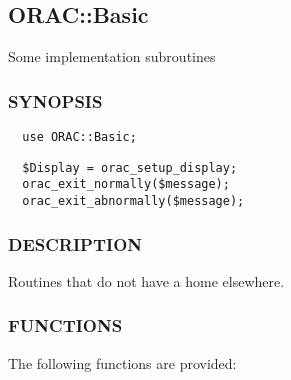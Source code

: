 \subsection{ORAC::Basic\label{ORAC::Basic}}


Some implementation subroutines

\subsubsection*{SYNOPSIS\label{ORAC::Basic_SYNOPSIS}}
\begin{verbatim}
  use ORAC::Basic;
\end{verbatim}
\begin{verbatim}
  $Display = orac_setup_display;
  orac_exit_normally($message);
  orac_exit_abnormally($message);
\end{verbatim}
\subsubsection*{DESCRIPTION\label{ORAC::Basic_DESCRIPTION}}


Routines that do not have a home elsewhere.

\subsubsection*{FUNCTIONS\label{ORAC::Basic_FUNCTIONS}}


The following functions are provided:

